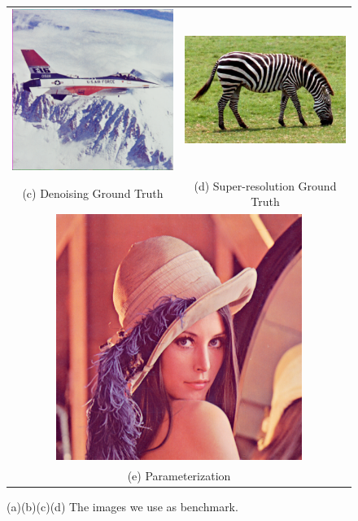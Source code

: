 \documentclass[A4]{article}
\begin{document}
\begin{figure}[H]
\begin{tabular}{cc}
\includegraphics[width=80mm]{denoising-gt.png} & \includegraphics[width=80mm]{sr-gt.png} \\
(c) Denoising Ground Truth & (d) Super-resolution Ground Truth \\[6pt]
\multicolumn{2}{c}{\includegraphics[width=80mm]{test-image.png}}\\
\multicolumn{2}{c}{(e) Parameterization }
\end{tabular}
\caption{(a)(b)(c)(d) The images we use as benchmark.}
\end{figure}
\end{document}
